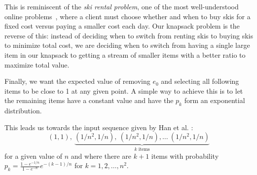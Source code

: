 This is reminiscent of the \emph{ski rental problem}, one of the most well-understood online problems~\cite{karlin}, where a client must choose whether and when to buy skis for a fixed cost versus paying a smaller cost each day. Our knapsack problem is the reverse of this: instead of deciding when to switch from renting skis to buying skis to minimize total cost, we are deciding when to switch from having a single large item in our knapsack to getting a stream of smaller items with a better ratio to maximize total value.

Finally, we want the expected value of removing $e_0$ and selecting all following items to be close to 1 at any given point. A simple way to achieve this is to let the remaining items have a constant value and have the $p_k$ form an exponential distribution.

This leads us towards the input sequence given by Han et al. \cite{han}:
\begin{equation}
	\label{eq:knapsack_dist}
	(1,1),\ \underbrace{(1/n^2,1/n),\ (1/n^2,1/n),\ldots\ (1/n^2,1/n)}_{k \text{ items}}
\end{equation}
for a given value of $n$ and where there are $k+1$ items with probability $p_k = \frac{1-e^{-1/n}}{1-e^{-n}} e^{-(k-1)/n}$ for $k=1,2,\ldots,n^2$.

